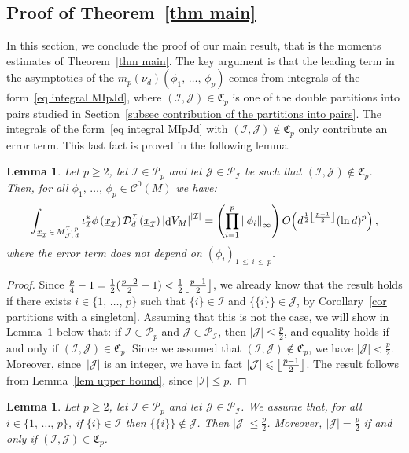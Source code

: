 \documentclass[10pt]{amsart}
\newtheorem{lemm}[theo]{Lemma}\newtheorem{prop}[theo]{Proposition}\newtheorem{coro}[theo]{Corollary}\newtheorem{conj}[theo]{Conjecture}
\theoremstyle{definition}\newtheorem{defi}[theo]{Definition}\newtheorem{rema}[theo]{Remark}\newtheorem{exam}[theo]{Example}\newtheorem{exem}[theo]{Example}\newtheorem{nota}[theo]{Notation}
\DeclareMathOperator{\dmesure}{d}
\DeclarePairedDelimiter{\floor}{\lfloor}{\rfloor}
\newcommand{\D}{\mathcal{D}}
\newcommand{\I}{\mathcal{I}}
\newcommand{\J}{\mathcal{J}}
\newcommand{\clC}{\mathcal{C}}
\newcommand{\frkC}{\mathfrak{C}}
\newcommand{\pa}{\mathcal{P}\!}
\newcommand{\norm}[1]{\left\lvert #1 \right\rvert}
\newcommand{\Norm}[1]{\left\lVert #1 \right\rVert}
\newcommand{\rmes}[1]{\norm{\dmesure\! V_{#1}}}
\renewcommand{\geq}{\geqslant}
\renewcommand{\leq}{\leqslant}
\begin{document}

\subsection{Proof of Theorem~\ref{thm main}}\label{subsec proof of the main theorem}

In this section, we conclude the proof of our main result, that is the moments estimates of Theorem~\ref{thm main}. The key argument is that the leading term in the asymptotics of the $m_p(\nu_d)(\phi_1,\,\dots,\,\phi_p)$ comes from integrals of the form~\eqref{eq integral MIpJd}, where $(\I,\J) \in \frkC_p$ is one of the double partitions into pairs studied in Section~\ref{subsec contribution of the partitions into pairs}. The integrals of the form~\eqref{eq integral MIpJd} with $(\I,\J) \notin \frkC_p$ only contribute an error term. This last fact is proved in the following lemma.

\begin{lemm}\label{lem order of the error terms}
Let $p \geq 2$, let $\I \in \pa_p$ and let $\J \in \pa_\I$ be such that $(\I,\J) \notin \frkC_p$. Then, for all $\phi_1,\,\dots,\,\phi_p \in \clC^0(M)$ we have:
\[
\int_{\underline{x}_\I\,\in\,M^{\I,\,p}_{\J,\,d}} \iota_\I^*\phi\left(\underline{x}_\I\right) \D^\I_d\left(\underline{x}_\I\right) \rmes{M}^{\norm{\I}} = \left(\prod_{i=1}^p \Norm{\phi_i}_\infty \right)O\!\left(d^{\frac{1}{2}\floor*{\frac{p-1}{2}}}(\ln d)^p\right),
\]
where the error term does not depend on $(\phi_i)_{1\,\leq\,i \,\leq\,p}$.
\end{lemm}

\begin{proof}
Since $\tfrac{p}{4}-1 = \tfrac{1}{2}(\tfrac{p-2}{2} -1) < \frac{1}{2} \floor*{\frac{p-1}{2}}$, we already know that the result holds if there exists $i \in \{1,\,\dots,\,p\}$ such that $\{i\} \in \I$ and $\{\{i\}\} \in \J$, by Corollary~\ref{cor partitions with a singleton}. Assuming that this is not the case, we will show in Lemma~\ref{lem combinatorics IJ} below that: if $\I \in \pa_p$ and $\J \in \pa_\I$, then $|\J| \leq \tfrac{p}{2}$, and equality holds if and only if $(\I,\J) \in \frkC_p$. Since we assumed that $(\I,\J) \notin \frkC_p$, we have $|\J| < \tfrac{p}{2}$. Moreover, since~$|\J|$ is an integer, we have in fact $|\J| \leq \floor*{\frac{p-1}{2}}$. The result follows from Lemma~\ref{lem upper bound}, since $|\I| \leq p$.
\end{proof}

\begin{lemm}\label{lem combinatorics IJ}
Let $p \geq 2$, let $\I \in \pa_p$ and let $\J \in \pa_\I$. We assume that, for all $i \in \{1,\,\dots,\,p\}$, if $\{i\} \in \I$ then $\{\{i\}\} \notin \J$. Then $|\J| \leq \tfrac{p}{2}$. Moreover, $|\J| = \frac{p}{2}$ if and only if $(\I,\J) \in \frkC_p$.
\end{lemm}
\end{document}
